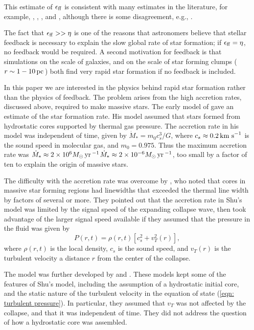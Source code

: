 \documentclass[iop,apj,numberedappendix]{emulateapj}
\newcommand       \phil[1]      {{\color{blue} #1}}
\newcommand       \be		{\begin{equation}}
\newcommand       \ee		{\end{equation}}
\newcommand       \pc		{\,{\rm pc \,}}
\newcommand       \yr		{\,{\rm yr \,}}
\newcommand       \kms          {\,{\rm km \,\, s}^{-1}}
\newcommand       \eff          {\epsilon_{\rm ff}}
\begin{document}
This estimate of $\eff$ is consistent with many estimates in the
literature, for example, \citet{2005ApJ...635L.173W}, \citet{2010ApJ...724..687L},
\citet{2010ApJ...723.1019H}, and
\citet{2011ApJ...729..133M}, although there is some disagreement, e.g.,
\citep{2012ApJ...745...69K}. 

The fact that $\eff>>\eta$ is one of the reasons that astronomers
believe that stellar feedback is necessary to explain the slow global
rate of star formation; if $\eff=\eta$, no feedback would be
required. A second motivation for feedback is that simulations on the
scale of galaxies, and on the scale of star forming clumps ($r\sim
1-10\pc$) both find very rapid star formation if no feedback is included.

In this paper we are interested in the physics behind rapid star
formation rather than the physics of feedback. The problem arises from
the high accretion rates, discussed above, required to make massive
stars. The early model of \citet{1977ApJ...214..488S} gave an estimate
of the star formation rate. His model assumed that stars formed from
hydrostatic cores supported by thermal gas pressure. The accretion
rate in his model was independent of time, given by $\dot
M_*=m_0c_s^3/G$, where $c_s\approx0.2\kms$ is the sound speed in
molecular gas, and $m_0=0.975$. Thus the maximum accretion rate was
\phil{\sout{$\dot M_*\approx2\times10^6M_\odot\yr^{-1}$}$\dot M_*\approx2\times10^{-6}M_\odot\yr^{-1}$}, too small by a factor of
ten to explain the origin of massive stars.

The difficulty with the accretion rate was overcome by
\citet{1992ApJ...396..631M}, who noted that cores in massive star
forming regions had linewidths that exceeded the thermal line width by
factors of several or more. They pointed out that the accretion rate
in Shu's model was limited by the signal speed of the expanding
collapse wave, then took advantage of the larger signal speed
available if they assumed that the pressure in the fluid was given by
%
\be \label{eqn: turbulent pressure}%
P(r,t)=\rho(r,t) \left[c_s^2+ v_T^2(r)\right],
\ee %
%
where $\rho(r,t)$ is the local density, $c_s$ is the sound speed, and
$v_T(r)$ is the turbulent velocity a distance $r$ from the center of
the collapse. 

The model was further developed by \citet{1997ApJ...476..750M} and
\citet{2003ApJ...585..850M}. These models kept some of the features of
Shu's model, including the assumption of a hydrostatic initial core,
and the static nature of the turbulent velocity in the equation of
state (\ref{eqn: turbulent pressure}). In particular, they assumed
that $v_T$ was not affected by the collapse, and that it was
independent of time. They did not address the question of how a
hydrostatic core was assembled.
\end{document}

